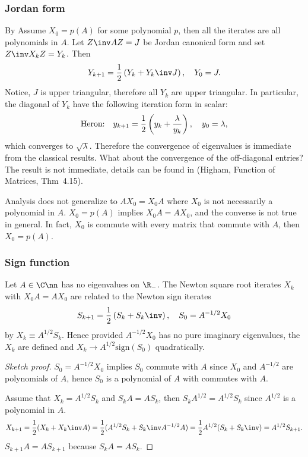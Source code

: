 \documentclass{article}
\def\sign{\mathrm{sign}}
\begin{document}
\subsubsection{Jordan form}
By  Assume $X_0 = p(A)$ for some polynomial $p$, then
all the iterates are all polynomials in $A$. Let $Z\inv AZ = J$ be
Jordan canonical form and set $Z\inv X_k Z = Y_k$. Then 
\begin{equation}\notag
    Y_{k+1} = \frac{1}{2}\left(Y_{k} + Y_{k}\inv J\right), 
    \quad Y_0 = J.
\end{equation}
Notice, $J$ is upper triangular, therefore all $Y_k$ are upper
triangular. In particular, the diagonal of $Y_k$ have the following
iteration form in scalar:
\begin{equation}\notag
    \text{Heron:} \quad y_{k+1} = \frac{1}{2}\left(y_k + 
    \frac{\lambda}{y_k}\right), \quad y_0 = \lambda,
\end{equation}
which converges to $\sqrt{\lambda}$. Therefore the convergence of
eigenvalues is immediate from the classical results. What about the
convergence of the off-diagonal entries? The result is not immediate,
details can be found in (Higham, Function of Matrices, Thm~4.15).

\begin{remark}
    Analysis does not generalize to $AX_0 = X_0A$ where $X_0$
    is not necessarily a polynomial in $A$. $X_0 = p(A)$ implies
    $X_0A = AX_0$, and the converse is not true in general. In fact,
    $X_0$ is commute with every matrix that commute with $A$, then
    $X_0 =p(A)$. 
\end{remark}

\subsubsection{Sign function}
\begin{theorem}
    Let $A\in\C\nn$ has no eigenvalues on $\R_-$. The Newton square root
    iterates $X_k$ with $X_0 A = AX_0$ are related to the Newton sign
    iterates
    \begin{equation}\notag
        S_{k+1} = \frac{1}{2}\left(S_k + S_k\inv\right), \quad S_0 = A^{-1/2}X_0 
    \end{equation}
    by $X_k \equiv A^{1/2}S_k$. Hence provided $A^{-1/2}X_0$ has no pure
    imaginary eigenvalues, the $X_k$ are defined and $X_k \to
    A^{1/2}\sign(S_0)$ quadratically.
\end{theorem}

\begin{proof}
    [Sketch proof]
    $S_0 = A^{-1/2} X_0$ implies $S_0$ commute with $A$ since
    $X_0$ and $A^{-1/2}$ are polynomials of $A$, hence $S_0$ is a
    polynomial of $A$ with commutes with $A$.

    Assume that $X_k = A^{1/2}S_k$ and $S_k A = AS_k$, then $S_k A^{1/2}
    = A^{1/2} S_k$ since $A^{1/2}$ is a polynomial in $A$.
    \begin{equation}\notag
        X_{k+1} = \frac{1}{2}(X_k + X_k\inv A)= \frac 12(A^{1/2}S_k + S_k\inv A^{-1/2}A) = \frac{1}{2}A^{1/2}(S_k + S_k\inv) = A^{1/2}S_{k+1}.
    \end{equation}
    $S_{k+1}A = AS_{k+1}$ because $S_kA = AS_k$.
\end{proof}
\end{document}

